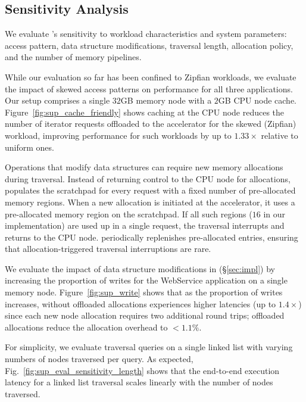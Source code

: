\subsection{\name Sensitivity Analysis}
\label{ssec:sensitivity}


We evaluate \name's sensitivity to workload characteristics and system parameters: access pattern, data structure modifications, traversal length, allocation policy, and the number of \name memory pipelines. 


While our evaluation so far has been confined to Zipfian workloads, we evaluate the impact of skewed access patterns on \name performance for all three applications. Our setup comprises a single $32$GB memory node with a $2$GB CPU node cache. Figure~\ref{fig:sup_cache_friendly} shows caching at the CPU node reduces the number of iterator requests offloaded to the \name accelerator for the skewed (Zipfian) workload, improving \name performance for such workloads by up to $1.33\times$ relative to uniform ones.

 Operations that modify data structures can require new memory allocations during traversal. Instead of returning control to the CPU node for allocations, \name populates the scratchpad for every request with a fixed number of pre-allocated memory regions. When a new allocation is initiated at the \name accelerator, it uses a pre-allocated memory region on the scratchpad. If all such regions ($16$ in our implementation) are used up in a single request, the traversal interrupts and returns to the CPU node. \name periodically replenishes pre-allocated entries, ensuring that allocation-triggered traversal interruptions are rare.

We evaluate the impact of data structure modifications in \name (\S\ref{sec:impl}) by increasing the proportion of writes for the WebService application on a single memory node. Figure~\ref{fig:sup_write} shows that as the proportion of writes increases, \name without offloaded allocations experiences higher latencies (up to $1.4\times$) since each new node allocation requires two additional round trips; offloaded allocations reduce the allocation overhead to $<1.1\%$.

 For simplicity, we evaluate traversal queries on a single linked list with varying numbers of nodes traversed per query. As expected, Fig.~\ref{fig:sup_eval_sensitivity_length} shows that the end-to-end execution latency for a linked list traversal scales linearly with the number of nodes traversed.

